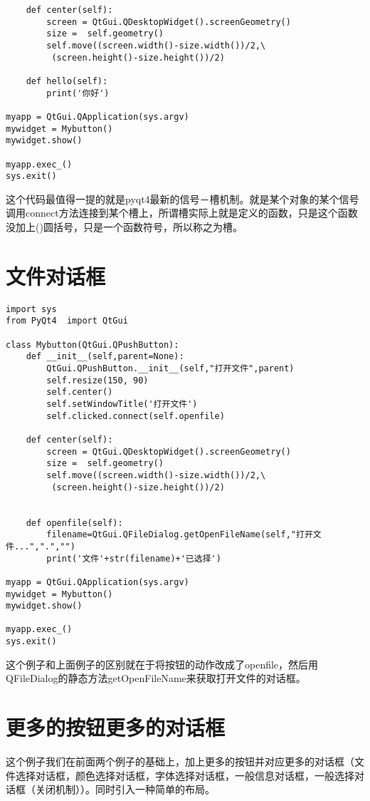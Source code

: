 \documentclass[12pt,oneside]{book}
\begin{document}
\begin{common-format}
\begin{Verbatim}
    def center(self):
        screen = QtGui.QDesktopWidget().screenGeometry()
        size =  self.geometry()
        self.move((screen.width()-size.width())/2,\
         (screen.height()-size.height())/2)

    def hello(self):
        print('你好')

myapp = QtGui.QApplication(sys.argv)
mywidget = Mybutton()
mywidget.show()

myapp.exec_()
sys.exit()
\end{Verbatim}
这个代码最值得一提的就是pyqt4最新的信号－槽机制。就是某个对象的某个信号调用connect方法连接到某个槽上，所谓槽实际上就是定义的函数，只是这个函数没加上()圆括号，只是一个函数符号，所以称之为槽。


\section{文件对话框}
\begin{Verbatim}
import sys
from PyQt4  import QtGui

class Mybutton(QtGui.QPushButton):
    def __init__(self,parent=None):
        QtGui.QPushButton.__init__(self,"打开文件",parent)
        self.resize(150, 90)
        self.center()
        self.setWindowTitle('打开文件')
        self.clicked.connect(self.openfile)

    def center(self):
        screen = QtGui.QDesktopWidget().screenGeometry()
        size =  self.geometry()
        self.move((screen.width()-size.width())/2,\
         (screen.height()-size.height())/2)


    def openfile(self):
        filename=QtGui.QFileDialog.getOpenFileName(self,"打开文件...",".","")
        print('文件'+str(filename)+'已选择')

myapp = QtGui.QApplication(sys.argv)
mywidget = Mybutton()
mywidget.show()

myapp.exec_()
sys.exit()
\end{Verbatim}
这个例子和上面例子的区别就在于将按钮的动作改成了openfile，然后用QFileDialog的静态方法getOpenFileName来获取打开文件的对话框。


\section{更多的按钮更多的对话框}
这个例子我们在前面两个例子的基础上，加上更多的按钮并对应更多的对话框（文件选择对话框，颜色选择对话框，字体选择对话框，一般信息对话框，一般选择对话框（关闭机制））。同时引入一种简单的布局。


\end{common-format}
\end{document}
